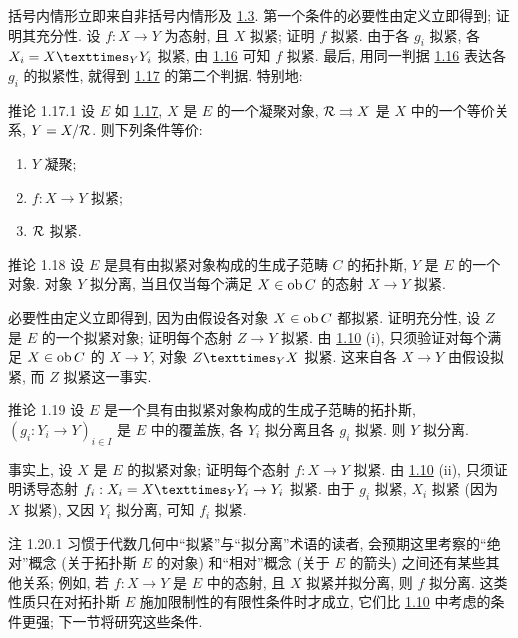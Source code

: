 括号内情形立即来自非括号内情形及 \hyperref[VI.prop1.3]{1.3}.
第一个条件的必要性由定义立即得到; 证明其充分性.
设 $f:X\to Y$ 为态射, 且\pageoriginale{} $X$ 拟紧;
证明 $f$ 拟紧.
由于各 $g_i$ 拟紧, 各 $X_i=\fprod{X}{Y_i}{Y}$ 拟紧,
由 \hyperref[VI.cor1.16]{1.16} 可知 $f$ 拟紧.
最后, 用同一判据 \hyperref[VI.cor1.16]{1.16}
表达各 $g_i$ 的拟紧性,
就得到 \hyperref[VI.cor1.17]{1.17} 的第二个判据.
特别地:

\begin{enonce*}{推论 1.17.1}
设 $E$ 如 \hyperref[VI.cor1.17]{1.17},
$X$ 是 $E$ 的一个凝聚对象,
${\mathcal R}\rightrightarrows X$ 是 $X$ 中的一个等价关系,
$Y=X/{\mathcal R}$. 则下列条件等价:
\begin{enumerate}
\renewcommand{\theenumi}{\roman{enumi}}
\renewcommand{\labelenumi}{(\theenumi)}
\item $Y$ 凝聚;
\item $f:X\to Y$ 拟紧;
\item ${\mathcal R}$ 拟紧.
\end{enumerate}
\end{enonce*}

\begin{enonce*}{推论 1.18}
设 $E$ 是具有由拟紧对象构成的生成子范畴 $C$ 的拓扑斯,
$Y$ 是 $E$ 的一个对象.
对象 $Y$ 拟分离,
当且仅当每个满足 $X\in\operatorname{ob} C$ 的态射 $X\to Y$ 拟紧.
\end{enonce*}

必要性由定义立即得到,
因为由假设各对象 $X\in\operatorname{ob} C$ 都拟紧.
证明充分性, 设 $Z$ 是 $E$ 的一个拟紧对象;
证明每个态射 $Z\to Y$ 拟紧.
由 \hyperref[VI.prop1.10]{1.10} (i),
只须验证对每个满足 $X\in\operatorname{ob} C$ 的 $X\to Y$,
对象 $\fprod{Z}{X}{Y}$ 拟紧.
这来自各 $X\to Y$ 由假设拟紧, 而 $Z$ 拟紧这一事实.

\begin{enonce*}{推论 1.19}
设\pageoriginale{} $E$ 是一个具有由拟紧对象构成的生成子范畴的拓扑斯,
$(g_i:Y_i\to Y)_{i\in I}$ 是 $E$ 中的覆盖族,
各 $Y_i$ 拟分离且各 $g_i$ 拟紧. 则 $Y$ 拟分离.
\end{enonce*}

事实上, 设 $X$ 是 $E$ 的拟紧对象;
证明每个态射 $f:X\to Y$ 拟紧.
由 \hyperref[VI.prop1.10]{1.10} (ii),
只须证明诱导态射 $f_i:X_i=\fprod{X}{Y_i}{Y}\to Y_i$ 拟紧.
由于 $g_i$ 拟紧, $X_i$ 拟紧 (因为 $X$ 拟紧),
又因 $Y_i$ 拟分离, 可知 $f_i$ 拟紧.

\begin{enonce*}[remark]{注 1.20.1}
习惯于代数几何中“拟紧”与“拟分离”术语的读者,
会预期这里考察的“绝对”概念 (关于拓扑斯 $E$ 的对象)
和“相对”概念 (关于 $E$ 的箭头) 之间还有某些其他关系;
例如, 若 $f:X\to Y$ 是 $E$ 中的态射,
且 $X$ 拟紧并拟分离, 则 $f$ 拟分离.
这类性质只在对拓扑斯 $E$ 施加限制性的有限性条件时才成立,
它们比 \hyperref[VI.prop1.10]{1.10} 中考虑的条件更强;
下一节将研究这些条件.
\end{enonce*}

